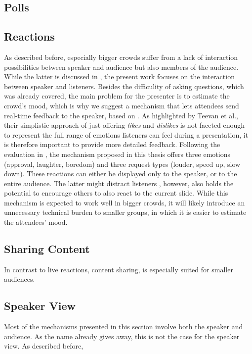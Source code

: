 
\subsection{Polls}


\subsection{Reactions}
As described before, especially bigger crowds suffer from a lack of interaction possibilities between speaker and audience but also members of the audience. While the latter is discussed in \cite{Bry:Backstage}, the present work focuses on the interaction between speaker and listeners. Besides the difficulity of asking questions, which was already covered, the main problem for the presenter is to estimate the crowd's mood, which is why we suggest a mechanism that lets attendees send real-time feedback to the speaker, based on \cite{Teevan:MobileFeedbackDuringPresentation}. As highlighted by Teevan et al., their simplistic approach of just offering \emph{likes} and \emph{dislikes} is not faceted enough to represent the full range of emotions listeners can feel during a presentation, it is therefore important to provide more detailed feedback. Following the evaluation in \cite{Teevan:MobileFeedbackDuringPresentation}, the mechanism proposed in this thesis offers three emotions (approval, laughter, boredom) and three request types (louder, speed up, slow down).
These reactions can either be displayed only to the speaker, or to the entire audience. The latter might distract listeners \cite{Teevan:MobileFeedbackDuringPresentation}, however, also holds the potential to encourage others to also react to the current slide. While this mechanism is expected to work well in bigger crowds, it will likely introduce an unnecessary technical burden to smaller groups, in which it is easier to estimate the attendees' mood. 

\subsection{Sharing Content}
In contrast to live reactions, content sharing, is especially suited for smaller audiences.

\subsection{Speaker View}
Most of the mechanisms presented in this section involve both the speaker and audience. As the name already gives away, this is not the case for the speaker view. As described before, 